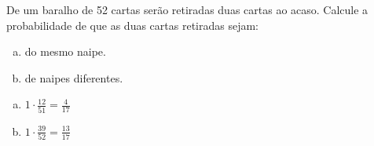 \begin{ex}
De um baralho de 52 cartas serão retiradas duas cartas ao acaso. Calcule a probabilidade de que as duas cartas retiradas sejam:
   \begin{enumerate}[(a)]
   \item do mesmo naipe.
   \item de naipes diferentes.
   \end{enumerate}
     \begin{sol}
      \phantom{A}
       \begin{enumerate} [(a)]
           \item $1\cdot\frac{12}{51}=\frac{4}{17}$
           \item $1\cdot\frac{39}{52}=\frac{13}{17}$
       \end{enumerate}
     \end{sol}
\end{ex}